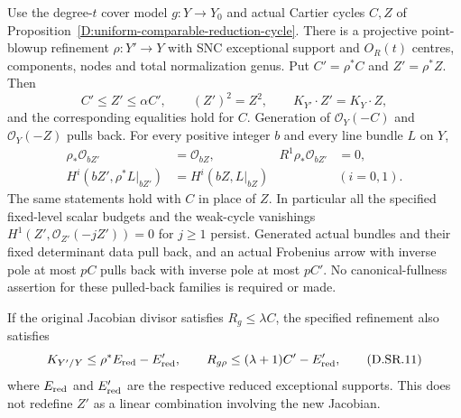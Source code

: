 \begin{corollary}
\label{D:SNC-refinement-inherited-cycles}
Use the degree-$t$ cover model $g:Y\to Y_0$ and actual
Cartier cycles $C,Z$ of
Proposition~\ref{D:uniform-comparable-reduction-cycle}.
There is a projective point-blowup refinement
$\rho:Y'\to Y$ with SNC exceptional support and $O_R(t)$
centres, components, nodes and total normalization genus.
Put $C'=\rho^*C$ and $Z'=\rho^*Z$. Then
\[
 C'\le Z'\le\alpha C',\qquad
 (Z')^2=Z^2,\qquad K_{Y'}\cdot Z'=K_Y\cdot Z,          \tag{D.SR.9}
\]
and the corresponding equalities hold for $C$.
Generation of $\mathcal O_Y(-C)$ and $\mathcal O_Y(-Z)$
pulls back. For every positive integer $b$ and every
line bundle $L$ on $Y$,
\[
 \begin{aligned}
 \rho_*\mathcal O_{bZ'}&=\mathcal O_{bZ},
       &R^1\rho_*\mathcal O_{bZ'}&=0,\\
 H^i(bZ',\rho^*L|_{bZ'})&=H^i(bZ,L|_{bZ})
       &&(i=0,1).
 \end{aligned}                                           \tag{D.SR.10}
\]
The same statements hold with $C$ in place of $Z$.
In particular all the specified fixed-level scalar budgets
and the weak-cycle vanishings
$H^1(Z',\mathcal O_{Z'}(-jZ'))=0$ for $j\ge1$ persist.
Generated actual bundles and their fixed determinant data
pull back, and an actual Frobenius arrow with inverse pole
at most $pC$ pulls back with inverse pole at most $pC'$.
No canonical-fullness assertion for these pulled-back
families is required or made.

If the original Jacobian divisor satisfies $R_g\le\lambda C$,
the specified refinement also satisfies
\[
 K_{Y'/Y}\le\rho^*E_{\rm red}-E'_{\rm red},\qquad
 R_{g\rho}\le(\lambda+1)C'-E'_{\rm red},              \tag{D.SR.11}
\]
where $E_{\rm red}$ and $E'_{\rm red}$ are the respective
reduced exceptional supports. This does not redefine
$Z'$ as a linear combination involving the new Jacobian.
\end{corollary}


